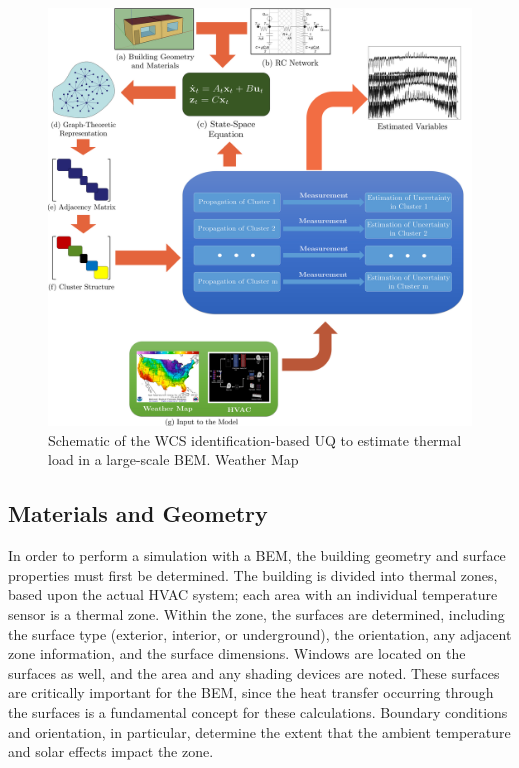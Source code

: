 \begin{figure}[H]
\centering
\includegraphics[width=\textwidth]{jbs_figures/bem_framework}
\caption{Schematic of the WCS identification-based UQ to estimate thermal load in a large-scale BEM. Weather Map~\citep{weathermap}}
\label{fig:bem_framework}
\end{figure}

\subsection{Materials and Geometry}
\label{MatGeo}

In order to perform a simulation with a BEM, the building geometry and surface properties must first be determined.  The building is divided into thermal zones, based upon the actual HVAC system; each area with an individual temperature sensor is a thermal zone.  Within the zone, the surfaces are determined, including the surface type (exterior, interior, or underground), the orientation, any adjacent zone information, and the surface dimensions.  Windows are located on the surfaces as well, and the area and any shading devices are noted.  These surfaces are critically important for the BEM, since the heat transfer occurring through the surfaces is a fundamental concept for these calculations.  Boundary conditions and orientation, in particular, determine the extent that the ambient temperature and solar effects impact the zone.  

